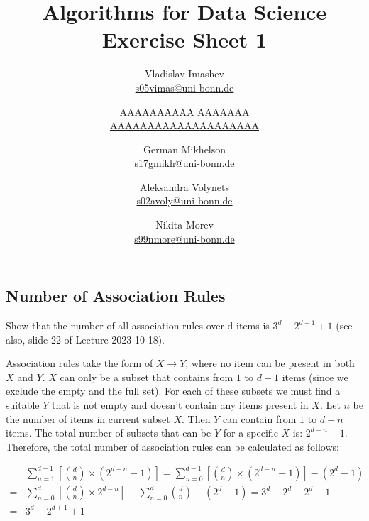 \documentclass{article}
\title{Algorithms for Data Science \\ Exercise Sheet 1}
\author{
  Vladislav Imashev \\ \href{mailto:s05vimas@uni-bonn.de}{s05vimas@uni-bonn.de} \and
  AAAAAAAAAA AAAAAAA \\ \href{mailto:AAAAAAAAAAAAAAAAAAAA}{AAAAAAAAAAAAAAAAAAAA} \and
  German Mikhelson \\ \href{mailto:s17gmikh@uni-bonn.de}{s17gmikh@uni-bonn.de} \and
  Aleksandra Volynets \\ \href{mailto:s02avoly@uni-bonn.de}{s02avoly@uni-bonn.de} \and
  Nikita Morev \\ \href{mailto:s99nmore@uni-bonn.de}{s99nmore@uni-bonn.de}
}
\begin{document}
  \maketitle

  \setcounter{section}{1}
  \subsection{Number of Association Rules}
  \begin{centerframebox}
    Show that the number of all association rules over d items is $3^d - 2^{d+1} + 1$
    (see also, slide 22 of Lecture 2023-10-18).
  \end{centerframebox}
  Association rules take the form of $X \to Y$, where no item can be present in both $X$ and $Y$. $X$ can only be a subset that contains from $1$ to $d-1$ items (since we exclude the empty and the full set).
  For each of these subsets we must find a suitable $Y$ that is not empty and doesn't contain any items present in $X$.
  Let $n$ be the number of items in current subset $X$. Then $Y$ can contain from $1$ to $d-n$ items.
  The total number of subsets that can be $Y$ for a specific $X$ is: $2^{d-n} - 1$.
  Therefore, the total number of association rules can be calculated as follows:

  \begin{align*}
    &\sum_{n=1}^{d-1} {\left[\binom {d} {n}  \times \left({2} ^ {d-n} -1 \right) \right] = \sum_{n=0}^{d-1} {\left[\binom {d} {n} \times ( {2} ^ {d-n} -1) \right] - \left({2} ^ {d} -1 \right)}}  \\
    =& \sum_{n=0}^{d} {\left[\binom {d} {n} \times {2} ^ {d-n} \right] - \sum_{n=0}^{d} {\binom {d} {n} -} \left({2} ^ {d} -1 \right)} = {3} ^ {d} - {2} ^ {d} - {2} ^ {d} +1  \\
    =& {3} ^ {d} - {2} ^ {d +1} +1 \\
  \end{align*}
\end{document}
